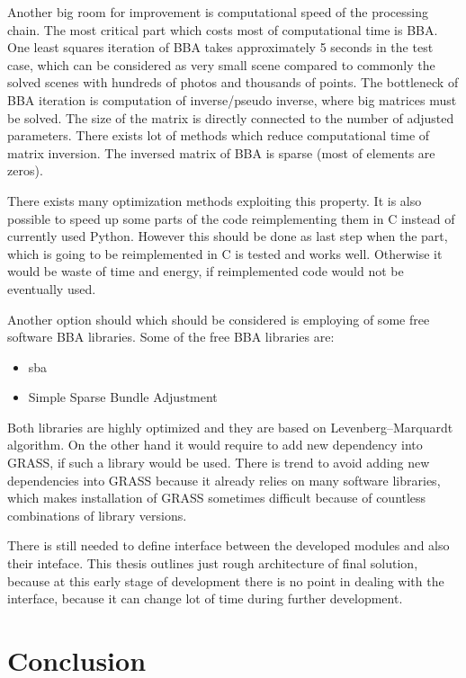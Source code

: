 \documentclass[a4paper,12pt]{article}
\begin{document}
Another big room for improvement is computational speed of the processing chain.
The most critical part which costs most of computational time is BBA.
One least squares  iteration of BBA takes approximately 5 seconds in the test case, which can be 
considered as very small scene compared to commonly the solved
scenes with hundreds of photos and thousands of points. The bottleneck of BBA iteration is computation of inverse/pseudo inverse, where big matrices 
must be solved. The size of the matrix is directly connected to the number of adjusted parameters. There exists  lot of methods which reduce computational 
time of matrix inversion. The inversed matrix of BBA is sparse (most of elements are zeros).

There exists many optimization methods exploiting this property. 
It is also possible to speed up some parts of the code reimplementing them in C instead of currently used Python. However this should be done 
as last step when the part, which is going to be reimplemented in C is tested and works well. Otherwise it would be waste of time and energy, if reimplemented 
code would not be eventually used. 

Another option should which should  be considered is employing of some free software BBA libraries.
Some of the free BBA libraries are:
\begin{itemize}
\item sba
\item Simple Sparse Bundle Adjustment 
\end{itemize}

Both libraries are highly optimized and they are based on Levenberg–Marquardt algorithm.
On the other hand it would require to add new dependency into GRASS, if such a library would be used. 
There is trend to avoid adding new dependencies into GRASS because it already relies on many software libraries,
which makes installation of GRASS sometimes difficult because of countless combinations of library versions.



There is still needed to define interface between the developed modules and also their inteface. 
This thesis outlines just rough architecture of final solution, because at this early stage of development 
there is no point in dealing with the interface, because it can change lot of time during further development.


\section{Conclusion}
\end{document}
